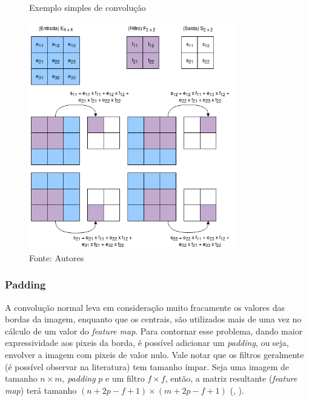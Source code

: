\documentclass[]{politex}
\begin{document}
\begin{figure}[H]
    \centering
    \caption{Exemplo simples de convolução}
    \includegraphics[width=0.8\textwidth]{Convolucao}
    \caption*{Fonte: Autores}
    \label{fig:convolucao}
\end{figure}

\subsubsection{Padding}
A convolução normal leva em consideração muito fracamente os valores das bordas da imagem, enquanto que os centrais, são utilizados mais de uma vez no cálculo de um valor do \textit{feature map}. Para contornar esse problema, dando maior expressividade aos pixeis da borda, é possível adicionar um \textit{padding}, ou seja, envolver a imagem com pixeis de valor nulo. Vale notar que os filtros geralmente (é possível observar na literatura) tem tamanho ímpar. Seja uma imagem de tamanho \(n \times m\), \textit{padding} \(p\) e um filtro \(f \times f\), então, a matriz resultante (\textit{feature map}) terá tamanho \((n+2p-f+1) \times (m+2p-f+1)\) (, \citeyear{cnncourse}).
\end{document}
